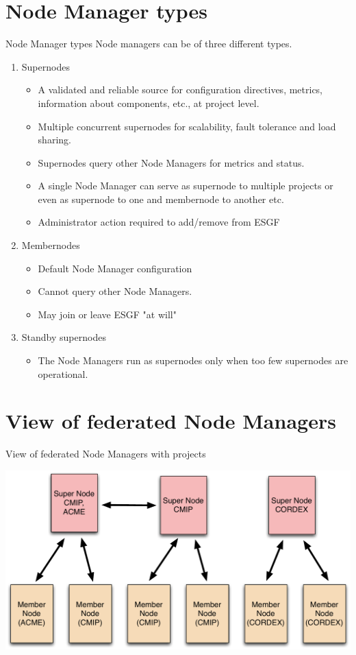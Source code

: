 \documentclass{beamer}
\begin{document}
\section{Node Manager types}
\begin{frame}{Node Manager types}
Node managers can be of three different types.
\begin{enumerate}
\item Supernodes
\begin{itemize}
\item A validated and reliable source for configuration directives, metrics, information about components, etc., at project level.
\item Multiple concurrent supernodes for scalability, fault tolerance and load sharing.
\item Supernodes query other Node Managers for metrics and status.
\item A single Node Manager can serve as supernode to multiple projects or even as supernode to one and membernode to another etc.
\item Administrator action required to add/remove from ESGF
\end{itemize}
\item Membernodes
\begin{itemize}
\item Default Node Manager configuration
\item Cannot query other Node Managers.
\item May join or leave ESGF "at will"
\end{itemize}
\item Standby supernodes
\begin{itemize}
\item The Node Managers run as supernodes only when too few supernodes are operational.
\end{itemize}
\end{enumerate}
\end{frame}



\section{View of federated Node Managers}
\begin{frame}{View of federated Node Managers with projects }
\begin{center}
\includegraphics[scale=0.35]{ESG-node-org.pdf}
\end{center}
\end{frame}
\end{document}
